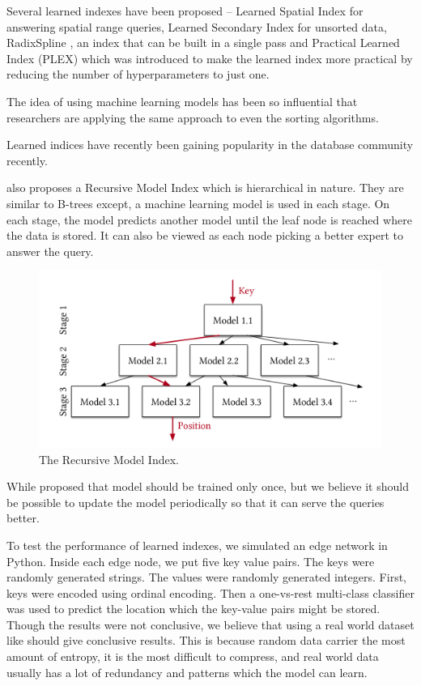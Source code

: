Several learned indexes have been proposed -- Learned Spatial Index
\cite{pandeyCaseLearnedSpatial2020} for answering spatial range queries, Learned
Secondary Index \cite{kipfLSILearnedSecondary2022} for unsorted data,
RadixSpline \cite{kipfRadixSplineSinglePassLearned2020}, an index that can be
built in a single pass and Practical Learned Index (PLEX)
\cite{stoianPracticalLearnedIndexing2021} which was introduced to make the
learned index more practical by reducing the number of hyperparameters to just
one.

The idea of using machine learning models has been so influential that
researchers are applying the same approach to even the sorting algorithms.
\cite{kristoCaseLearnedSorting2020}

Learned indices have recently been gaining popularity in the database community
recently.


\citet{kraskaCaseLearnedIndex2018} also proposes a Recursive Model Index which
is hierarchical in nature. They are similar to B-trees except, a machine
learning model is used in each stage. On each stage, the model predicts another
model until the leaf node is reached where the data is stored. It can also be
viewed as each node picking a better expert to answer the query.

\begin{figure}[h]
      \centering
      \includegraphics[width=1.0\textwidth]{RMI.png}
      \caption{The Recursive Model Index. \cite{kraskaCaseLearnedIndex2018}}
\end{figure}

While \citet{kraskaCaseLearnedIndex2018} proposed that model should be trained
only once, but we believe it should be possible to update the model periodically
so that it can serve the queries better.

To test the performance of learned indexes, we simulated an edge network in
Python. Inside each edge node, we put five key value pairs. The keys were
randomly generated strings. The values were randomly generated integers. First,
keys were encoded using ordinal encoding. Then a one-vs-rest multi-class
classifier was used to predict the location which the key-value pairs might be
stored. Though the results were not conclusive, we believe that using a real
world dataset like \cite{taxi&limousinecommissionNewYorkTaxi} should give
conclusive results. This is because random data carrier the most amount of
entropy, it is the most difficult to compress, and real world data usually has a
lot of redundancy and patterns which the model can learn.

